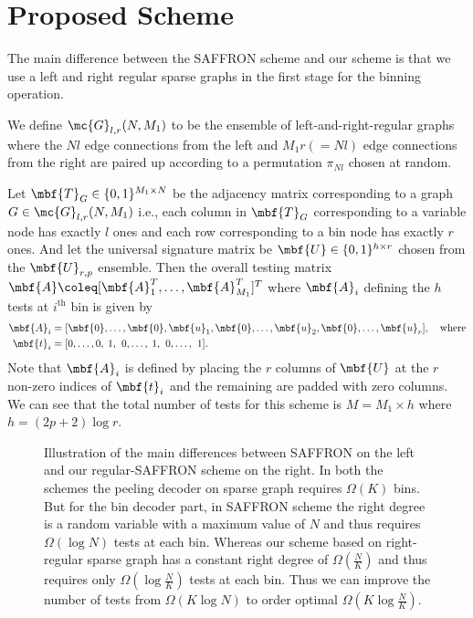 \documentclass[conference,twocolumn]{IEEEtran}
\begin{document}
\section{Proposed Scheme}
The main difference between the SAFFRON scheme and our scheme is that we use a left and right regular sparse graphs in the first stage for the binning operation.

\begin{definition}
We define $\mc{G}_{l,r}(N,M_1)$ to be the ensemble of left-and-right-regular graphs where the $Nl$ edge connections from the left and $M_1r(=Nl)$ edge connections from the right are paired up according to a permutation $\pi_{Nl}$ chosen at random. 
\end{definition}

 Let $\mbf{T}_{G}\in\{0,1\}^{M_1\times N }$ be the adjacency matrix corresponding to a graph $G\in\mc{G}_{l,r}(N,M_1)$ i.e., each column in $\mbf{T}_{G}$ corresponding to a variable node has exactly $l$ ones and each row corresponding to a bin node has exactly $r$ ones. And let the universal signature matrix be $\mbf{U}\in\{0,1\}^{h \times r}$ chosen from the $\mbf{U}_{r,p}$ ensemble. Then the overall testing matrix $\mbf{A}\coleq [\mbf{A}_{1}^{T},\ldots,\mbf{A}_{M_{1}}^{T}]^T$ where $\mbf{A}_{i}$ defining the $h$ tests at $i^{\text{th}}$ bin is given by
 \begin{align}
 \mbf{A}_i&=[\mbf{0},\ldots,\mbf{0},\mbf{u}_1, \mbf{0},\ldots, \mbf{u}_2,\mbf{0}, \ldots, \mbf{u}_{r}],\quad \text{where}\label{Eqn:TestingMatrixDefn}\\
\mbf{t}_i &= [0,\ldots,0,\hspace{0.6ex}1,\hspace{0.9ex} 0, \ldots,\hspace{0.6ex}1,\hspace{0.9ex}0, \ldots, \hspace{0.9ex}1].\nonumber
 \end{align}
Note that $\mbf{A}_i$ is defined by placing the $r$ columns of $\mbf{U}$ at the $r$ non-zero indices of $\mbf{t}_i$ and the remaining are padded with zero columns. We can see that the total number of tests for this scheme is $M=M_1\times h$ where $h=(2p+2)\log r$.

\begin{figure*}[t!]
\centering \scalebox{1}{}
\caption{Illustration of the main differences between SAFFRON \cite{lee2015saffron} on the left and our regular-SAFFRON scheme on the right. In both the schemes the peeling decoder on sparse graph requires $\Omega(K)$ bins. But for the bin decoder part, in SAFFRON scheme the right degree is a random variable with a maximum value of $N$ and thus requires $\Omega(\log N)$ tests at each bin. Whereas our scheme based on right-regular sparse graph has a constant right degree of $\Omega(\frac{N}{K})$ and thus requires only $\Omega(\log \frac{N}{K})$ tests at each bin. Thus we can improve the number of tests from $\Omega (K\log N)$ to order optimal $\Omega(K\log \frac{N}{K})$.}
\end{figure*}
\end{document}
